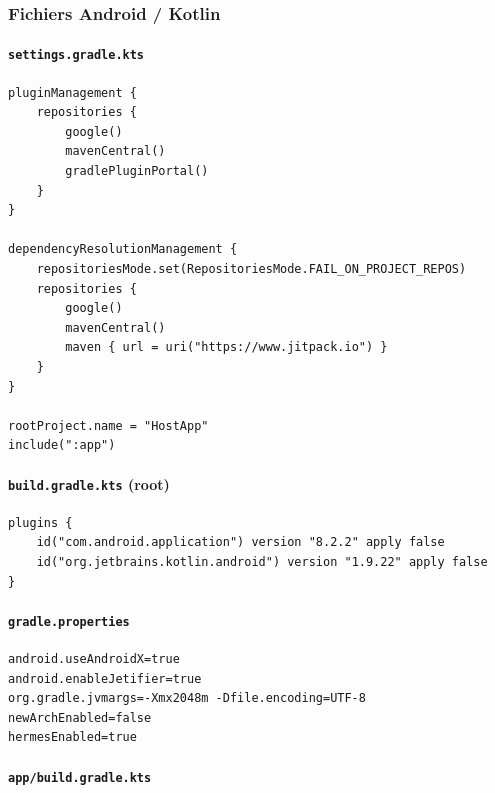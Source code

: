 \documentclass[11pt]{article}
\begin{document}
\subsubsection*{Fichiers Android / Kotlin}

\paragraph{\texttt{settings.gradle.kts}}

\begin{verbatim}
pluginManagement {
    repositories {
        google()
        mavenCentral()
        gradlePluginPortal()
    }
}

dependencyResolutionManagement {
    repositoriesMode.set(RepositoriesMode.FAIL_ON_PROJECT_REPOS)
    repositories {
        google()
        mavenCentral()
        maven { url = uri("https://www.jitpack.io") }
    }
}

rootProject.name = "HostApp"
include(":app")
\end{verbatim}

\paragraph{\texttt{build.gradle.kts} (root)}

\begin{verbatim}
plugins {
    id("com.android.application") version "8.2.2" apply false
    id("org.jetbrains.kotlin.android") version "1.9.22" apply false
}
\end{verbatim}

\paragraph{\texttt{gradle.properties}}

\begin{verbatim}
android.useAndroidX=true
android.enableJetifier=true
org.gradle.jvmargs=-Xmx2048m -Dfile.encoding=UTF-8
newArchEnabled=false
hermesEnabled=true
\end{verbatim}

\paragraph{\texttt{app/build.gradle.kts}}
\end{document}
